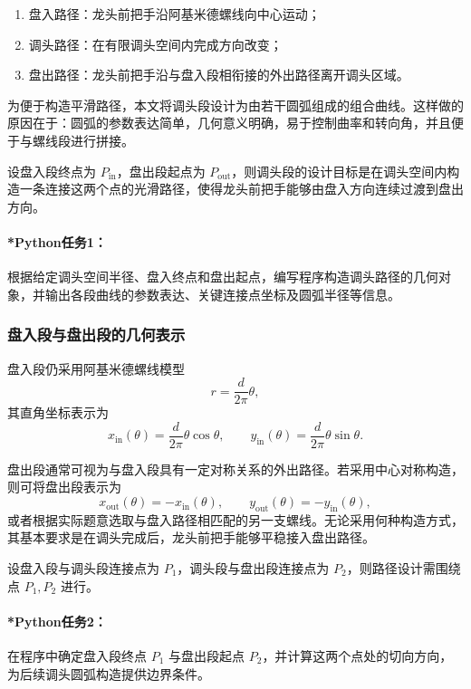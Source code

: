 \documentclass[12pt,a4paper]{ctexart}
\begin{document}
\begin{enumerate}
    \item 盘入路径：龙头前把手沿阿基米德螺线向中心运动；
    \item 调头路径：在有限调头空间内完成方向改变；
    \item 盘出路径：龙头前把手沿与盘入段相衔接的外出路径离开调头区域。
\end{enumerate}

为便于构造平滑路径，本文将调头段设计为由若干圆弧组成的组合曲线。这样做的原因在于：圆弧的参数表达简单，几何意义明确，易于控制曲率和转向角，并且便于与螺线段进行拼接。

设盘入段终点为 $P_{\mathrm{in}}$，盘出段起点为 $P_{\mathrm{out}}$，则调头段的设计目标是在调头空间内构造一条连接这两个点的光滑路径，使得龙头前把手能够由盘入方向连续过渡到盘出方向。

\paragraph{*Python任务1：}
根据给定调头空间半径、盘入终点和盘出起点，编写程序构造调头路径的几何对象，并输出各段曲线的参数表达、关键连接点坐标及圆弧半径等信息。

\subsubsection{盘入段与盘出段的几何表示}
盘入段仍采用阿基米德螺线模型
\begin{equation}
r=\frac{d}{2\pi}\theta,
\end{equation}
其直角坐标表示为
\begin{equation}
x_{\mathrm{in}}(\theta)=\frac{d}{2\pi}\theta\cos\theta,
\qquad
y_{\mathrm{in}}(\theta)=\frac{d}{2\pi}\theta\sin\theta.
\end{equation}

盘出段通常可视为与盘入段具有一定对称关系的外出路径。若采用中心对称构造，则可将盘出段表示为
\begin{equation}
x_{\mathrm{out}}(\theta)=-x_{\mathrm{in}}(\theta),\qquad
y_{\mathrm{out}}(\theta)=-y_{\mathrm{in}}(\theta),
\end{equation}
或者根据实际题意选取与盘入路径相匹配的另一支螺线。无论采用何种构造方式，其基本要求是在调头完成后，龙头前把手能够平稳接入盘出路径。

设盘入段与调头段连接点为 $P_1$，调头段与盘出段连接点为 $P_2$，则路径设计需围绕点 $P_1,P_2$ 进行。

\paragraph{*Python任务2：}
在程序中确定盘入段终点 $P_1$ 与盘出段起点 $P_2$，并计算这两个点处的切向方向，为后续调头圆弧构造提供边界条件。
\end{document}
